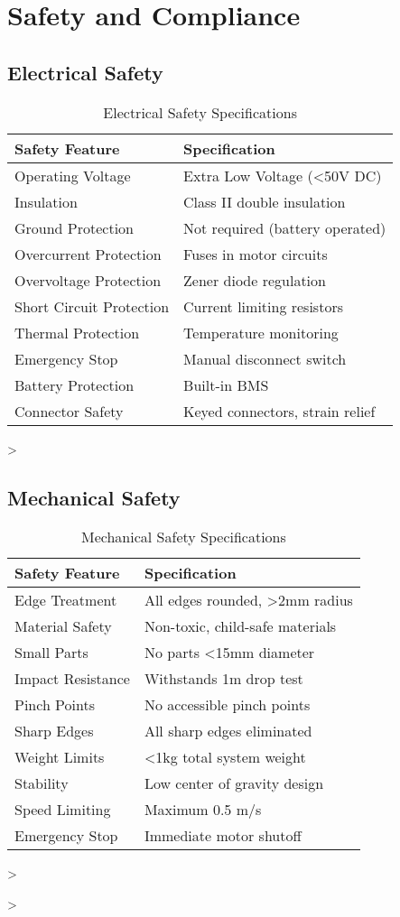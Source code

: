 \section{Safety and Compliance}

\subsection{Electrical Safety}

\begin{table}[H]
\centering
\caption{Electrical Safety Specifications}
\begin{tabular}{|l|l|}
\hline
\textbf{Safety Feature} & \textbf{Specification} \\
\hline
Operating Voltage & Extra Low Voltage (<50V DC) \\
Insulation & Class II double insulation \\
Ground Protection & Not required (battery operated) \\
Overcurrent Protection & Fuses in motor circuits \\
Overvoltage Protection & Zener diode regulation \\
Short Circuit Protection & Current limiting resistors \\
Thermal Protection & Temperature monitoring \\
Emergency Stop & Manual disconnect switch \\
Battery Protection & Built-in BMS \\
Connector Safety & Keyed connectors, strain relief \\
\hline
\end{tabular}
\label{tab:electrical_safety}
\end{table}>

\subsection{Mechanical Safety}

\begin{table}[H]
\centering
\caption{Mechanical Safety Specifications}
\begin{tabular}{|l|l|}
\hline
\textbf{Safety Feature} & \textbf{Specification} \\
\hline
Edge Treatment & All edges rounded, >2mm radius \\
Material Safety & Non-toxic, child-safe materials \\
Small Parts & No parts <15mm diameter \\
Impact Resistance & Withstands 1m drop test \\
Pinch Points & No accessible pinch points \\
Sharp Edges & All sharp edges eliminated \\
Weight Limits & <1kg total system weight \\
Stability & Low center of gravity design \\
Speed Limiting & Maximum 0.5 m/s \\
Emergency Stop & Immediate motor shutoff \\
\hline
\end{tabular}>
\label{tab:mechanical_safety}
\end{table}>

